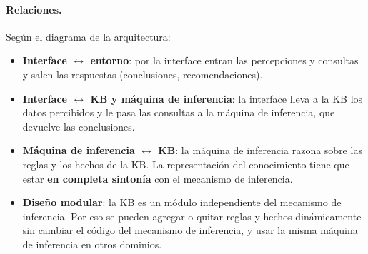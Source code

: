 \documentclass[11pt,a4paper]{article}
\begin{document}
\paragraph{Relaciones.} Según el diagrama de la arquitectura:
\begin{itemize}
  \item \textbf{Interface $\leftrightarrow$ entorno}: por la interface entran las percepciones y consultas y salen las respuestas (conclusiones, recomendaciones).
  \item \textbf{Interface $\leftrightarrow$ KB y máquina de inferencia}: la interface lleva a la KB los datos percibidos y le pasa las consultas a la máquina de inferencia, que devuelve las conclusiones.
  \item \textbf{Máquina de inferencia $\leftrightarrow$ KB}: la máquina de inferencia razona sobre las reglas y los hechos de la KB. La representación del conocimiento tiene que estar \textbf{en completa sintonía} con el mecanismo de inferencia.
  \item \textbf{Diseño modular}: la KB es un módulo independiente del mecanismo de inferencia. Por eso se pueden agregar o quitar reglas y hechos dinámicamente sin cambiar el código del mecanismo de inferencia, y usar la misma máquina de inferencia en otros dominios.
\end{itemize}
\end{document}
